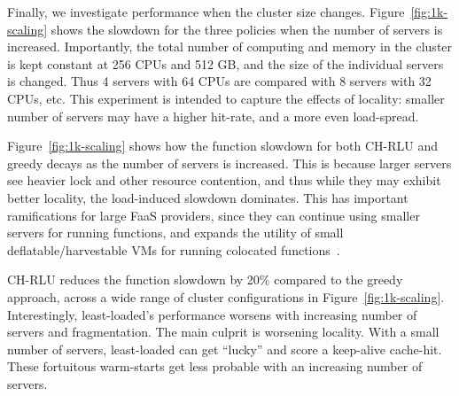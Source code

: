 Finally, we investigate performance when the cluster size changes.
Figure~\ref{fig:1k-scaling} shows the slowdown for the three policies when the number of servers is increased.
Importantly, the total number of computing and memory in the cluster is kept constant at 256 CPUs and 512 GB, and the size of the individual servers is changed.
Thus 4 servers with 64 CPUs are compared with 8 servers with 32 CPUs, etc.
This experiment is intended to capture the effects of locality: smaller number of servers may have a higher hit-rate, and a more even load-spread.

Figure~\ref{fig:1k-scaling} shows how the function slowdown for both CH-RLU and greedy decays as the number of servers is increased.  
This is because larger servers see heavier lock and other resource contention, and thus while they may exhibit better locality, the load-induced slowdown dominates.
This has important ramifications for large FaaS providers, since they can continue using smaller servers for running functions, and expands the utility of small deflatable/harvestable VMs for running colocated functions~\cite{serverless-harvest-sosp21}.

CH-RLU reduces the function slowdown by 20\% compared to the greedy approach, across a wide range of cluster configurations in Figure~\ref{fig:1k-scaling}. 
Interestingly, least-loaded's performance worsens with increasing number of servers and fragmentation.
The main culprit is worsening locality.
With a small number of servers, least-loaded can get ``lucky'' and score a keep-alive cache-hit.
These fortuitous warm-starts get less probable with an increasing number of servers. 


